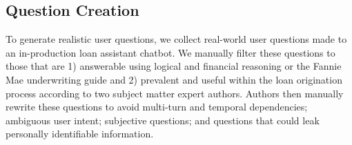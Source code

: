 \documentclass[11pt]{article}
\begin{document}






\subsection{Question Creation}
\label{sec:question-creation}

To generate realistic user questions, we collect real-world user questions made to an in-production loan assistant chatbot.
We manually filter these questions to those that are 1) answerable using logical and financial reasoning or the Fannie Mae underwriting guide \citep{fanniemae_selling_2025} and 2) prevalent and useful within the loan origination process according to two subject matter expert authors. 
Authors then manually rewrite these questions to avoid multi-turn and temporal dependencies; ambiguous user intent; subjective questions; and questions that could leak personally identifiable information.
\end{document}
